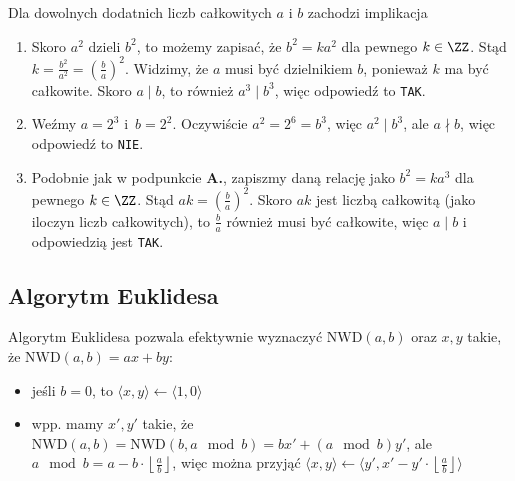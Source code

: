 \begin{exam}
    Dla dowolnych dodatnich liczb całkowitych $a$ i $b$ zachodzi implikacja
    \begin{enumerate}[\bf A.]
        \item Skoro $a^2$ dzieli $b^2$, to możemy zapisać, że $b^2=ka^2$ dla pewnego $k\in\ZZ$. Stąd $k=\frac{b^2}{a^2}=(\frac{b}{a})^2$. Widzimy, że $a$ musi być dzielnikiem $b$, ponieważ $k$ ma być całkowite. Skoro $a\mid b$, to również $a^3\mid b^3$, więc odpowiedź to \texttt{TAK}.
        \item Weźmy $a=2^3$ i~$b=2^2$. Oczywiście $a^2=2^6=b^3$, więc $a^2\mid b^3$, ale $a\nmid b$, więc odpowiedź to \texttt{NIE}.
        \item Podobnie jak w podpunkcie \textbf{A.}, zapiszmy daną relację jako $b^2=ka^3$ dla pewnego $k\in\ZZ$. Stąd $ak=(\frac{b}{a})^2$. Skoro $ak$ jest liczbą całkowitą (jako iloczyn liczb całkowitych), to $\frac{b}{a}$ również musi być całkowite, więc $a\mid b$ i odpowiedzią jest \texttt{TAK}.
    \end{enumerate}
\end{exam}

\subsection{Algorytm Euklidesa}

Algorytm Euklidesa pozwala efektywnie wyznaczyć $\mathrm{NWD}(a,b)$ oraz $x,y$ takie, że $\mathrm{NWD}(a,b)=ax+by$:
\begin{itemize}
    \item jeśli $b=0$, to $\langle x,y\rangle\leftarrow\langle1,0\rangle$
    \item wpp. mamy $x',y'$ takie, że $\mathrm{NWD}(a,b)=\mathrm{NWD}(b,a\mod{b})=bx'+(a\mod{b})y'$, ale $a\mod{b}=a-b\cdot\left\lfloor\frac{a}{b}\right\rfloor$, więc można przyjąć $\langle x,y\rangle\leftarrow\langle y',x'-y'\cdot\left\lfloor\frac{a}{b}\right\rfloor\rangle$
\end{itemize}

